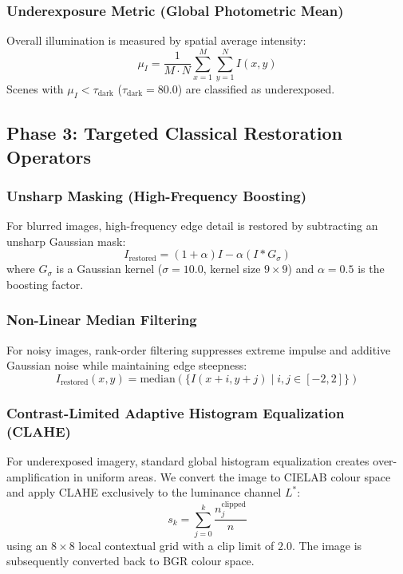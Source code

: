 \documentclass[conference]{IEEEtran}
\begin{document}
\subsubsection{Underexposure Metric (Global Photometric Mean)}
Overall illumination is measured by spatial average intensity:
\begin{equation}
\mu_I = \frac{1}{M \cdot N} \sum_{x=1}^{M} \sum_{y=1}^{N} I(x,y)
\end{equation}
Scenes with $\mu_I < \tau_{\text{dark}}$ ($\tau_{\text{dark}} = 80.0$) are classified as underexposed.

\subsection{Phase 3: Targeted Classical Restoration Operators}

\subsubsection{Unsharp Masking (High-Frequency Boosting)}
For blurred images, high-frequency edge detail is restored by subtracting an unsharp Gaussian mask:
\begin{equation}
I_{\text{restored}} = (1 + \alpha) I - \alpha (I * G_{\sigma})
\end{equation}
where $G_\sigma$ is a Gaussian kernel ($\sigma = 10.0$, kernel size $9 \times 9$) and $\alpha = 0.5$ is the boosting factor.

\subsubsection{Non-Linear Median Filtering}
For noisy images, rank-order filtering suppresses extreme impulse and additive Gaussian noise while maintaining edge steepness:
\begin{equation}
I_{\text{restored}}(x,y) = \text{median}\left(\{ I(x+i, y+j) \mid i,j \in [-2, 2] \}\right)
\end{equation}

\subsubsection{Contrast-Limited Adaptive Histogram Equalization (CLAHE)}
For underexposed imagery, standard global histogram equalization creates over-amplification in uniform areas. We convert the image to CIELAB colour space and apply CLAHE exclusively to the luminance channel $L^*$:
\begin{equation}
s_k = \sum_{j=0}^{k} \frac{n_j^{\text{clipped}}}{n}
\end{equation}
using an $8 \times 8$ local contextual grid with a clip limit of $2.0$. The image is subsequently converted back to BGR colour space.
\end{document}
